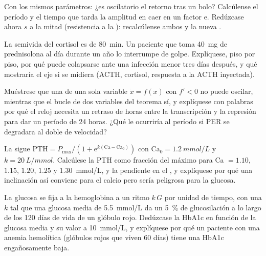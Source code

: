 \begin{exercise}[$\star\star$]\label{exo:b3:endocrinology:8}
Con los mismos parámetros: ¿es oscilatorio el retorno tras un bolo?
Calcúlense el período y el tiempo que tarda la amplitud en caer en un
factor $\mathrm{e}$. Redúzcase ahora $s$ a la mitad (resistencia a la
): recalcúlense ambos y la nueva .
\end{exercise}

\begin{exercise}[$\star\star$]\label{exo:b3:endocrinology:9}
La semivida del cortisol es de \qty{80}{min}. Un paciente que toma
\qty{40}{mg} de prednisolona al día durante un año lo interrumpe de
golpe. Explíquese, piso por piso, por qué puede colapsarse ante una
infección menor tres días después, y qué mostraría el eje si se midiera
(ACTH, cortisol, respuesta a la ACTH inyectada).
\end{exercise}

\begin{exercise}[$\star\star\star$]\label{exo:b3:endocrinology:10}
Muéstrese que una  de una sola variable
$\dot x = f(x)$ con $f' < 0$ no puede oscilar, mientras que el bucle de
dos variables del teorema sí, y explíquese con palabras por qué el
reloj necesita un retraso de horas entre la transcripción y la
represión para dar un período de 24 horas. ¿Qué le ocurriría al período
si PER se degradara al doble de velocidad?
\end{exercise}

\begin{exercise}[$\star\star\star$]\label{exo:b3:endocrinology:11}
La  sigue $\text{PTH} = P_{\max}/(1 +
\mathrm{e}^{k(\text{Ca} - \text{Ca}_{0})})$ con $\text{Ca}_{0} =
\qty{1.2}{mmol/L}$ y $k = \qty{20}{L/mmol}$. Calcúlese la PTH como
fracción del máximo para Ca $= 1.10$, $1.15$, $1.20$, $1.25$ y
\qty{1.30}{mmol/L}, y la pendiente en el , y
explíquese por qué una inclinación así conviene para el calcio pero
sería peligrosa para la glucosa.
\end{exercise}

\begin{exercise}[$\star\star\star$]\label{exo:b3:endocrinology:12}
La glucosa se fija a la hemoglobina a un ritmo $k\,G$ por unidad de
tiempo, con una $k$ tal que una glucosa media de \qty{5.5}{mmol/L} da
un \qty{5}{\%} de glucosilación a lo largo de los 120 días de vida de
un glóbulo rojo. Dedúzcase la HbA1c en función de la glucosa media y su
valor a \qty{10}{mmol/L}, y explíquese por qué un paciente con una
anemia hemolítica (glóbulos rojos que viven 60 días) tiene una HbA1c
engañosamente baja.
\end{exercise}


